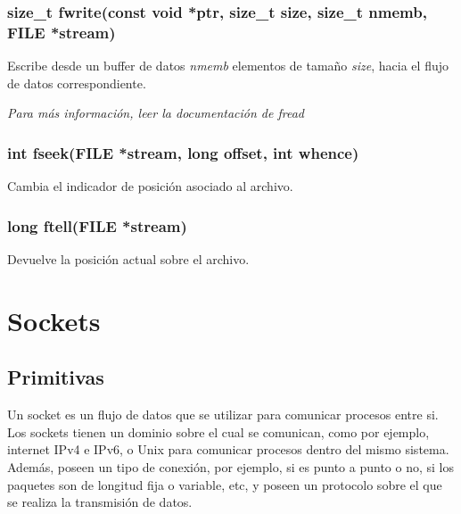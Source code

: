 \documentclass[a4paper, twoside]{article}
\begin{document}
\subsubsection {size\_t fwrite(const void *ptr, size\_t size, size\_t nmemb, FILE *stream)}
Escribe desde un buffer de datos \emph{nmemb} elementos de tamaño \emph{size}, hacia el flujo de datos correspondiente.

\textit{Para más información, leer la documentación de fread}

\subsubsection {int fseek(FILE *stream, long offset, int whence)}
Cambia el indicador de posición asociado al archivo.\\

\subsubsection {long ftell(FILE *stream)}
Devuelve la posición actual sobre el archivo.

\newpage
\section{Sockets}
\subsection{Primitivas}
Un socket es un flujo de datos que se utilizar para comunicar procesos entre si. Los sockets tienen un dominio sobre el cual se comunican, como por ejemplo, internet IPv4 e IPv6, o Unix para comunicar procesos dentro del mismo sistema. Además, poseen un tipo de conexión, por ejemplo, si es punto a punto o no, si los paquetes son de longitud fija o variable, etc, y poseen un protocolo sobre el que se realiza la transmisión de datos.
\end{document}
